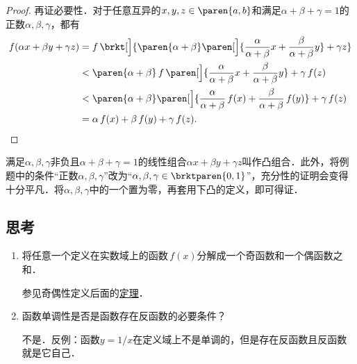\begin{example*}
\begin{proof}
    再证必要性．对于任意互异的\(x, y, z \in \paren{a,b}\)和满足\(\alpha+\beta+\gamma=1\)的正数\(\alpha, \beta, \gamma\)，都有
    \[
      \begin{split}
        f(\alpha x + \beta y + \gamma z)
        &= f\,\brkt[\Big]{\paren{\alpha+\beta}\paren[\Big]{\frac{\alpha}{\alpha+\beta} x + \frac{\beta}{\alpha+\beta} y} + \gamma z} \\
        &< \paren{\alpha+\beta}\,f\,\paren[\Big]{\frac{\alpha}{\alpha+\beta} x + \frac{\beta}{\alpha+\beta} y} + \gamma\,f(z) \\
        &< \paren{\alpha+\beta}\paren[\Big]{\frac{\alpha}{\alpha+\beta}\,f(x) + \frac{\beta}{\alpha+\beta}\,f(y)} + \gamma\,f(z) \\
        &= \alpha\,f(x) + \beta\,f(y) + \gamma\,f(z). \qedhere
      \end{split}
    \]

  \end{proof}
  \begin{remark}
    满足\(\alpha, \beta, \gamma\)非负且\(\alpha + \beta + \gamma = 1\)的线性组合\(\alpha x + \beta y + \gamma z\)叫作凸组合\cite{ConvexCombWiki}．此外，将例题中的条件“正数\(\alpha, \beta, \gamma\)”改为“\(\alpha, \beta, \gamma \in \brktparen{0,1}\)”，充分性的证明会变得十分平凡．将\(\alpha, \beta, \gamma\)中的一个置为零，再套用下凸的定义，即可得证．
  \end{remark}
\end{example*}

\subsection*{思考}

\begin{enumerate}
\item 将任意一个定义在实数域上的函数\(\,f(x)\)分解成一个奇函数和一个偶函数之和．

  \ifshowsolp
    参见奇偶性定义后面的\hyperlink{T:evenodd}{定理}．
  \fi

\item 函数单调性是否是函数存在反函数的必要条件？

  \ifshowsolp
    不是．反例：函数\(y = 1/x\)在定义域上不是单调的，但是存在反函数且反函数就是它自己．
  \fi
\end{enumerate}

